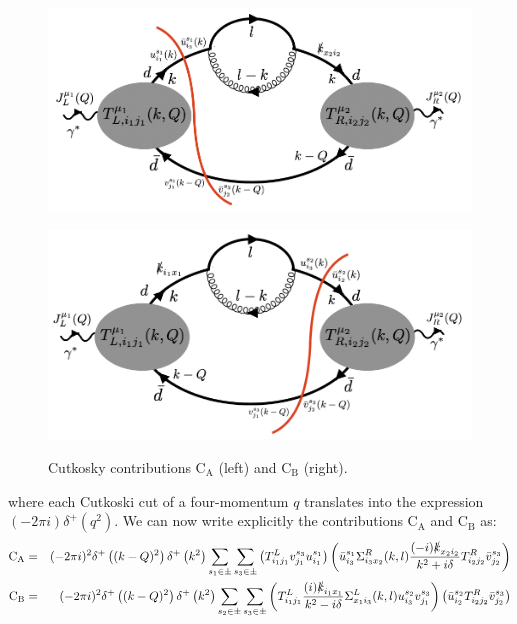 \documentclass[11pt]{article}
\begin{document}
\begin{figure}[ht!]
\begin{center}
\begin{minipage}{0.5\linewidth}
\centering
{\includegraphics[width=1\linewidth]{CA.png}}
\end{minipage}\hfill
\begin{minipage}{0.5\linewidth}
\centering
{\includegraphics[width=1\linewidth]{CB.png}}
\end{minipage}
{\caption{\label{CAB} Cutkosky contributions C$_\textrm{A}$ (left) and C$_\textrm{B}$ (right).}}
\end{center}
\end{figure}
\noindent where each Cutkoski cut of a four-momentum $q$ translates into the expression $(-2\pi i)\delta^{+}\left(q^2\right)$.
We can now write explicitly the contributions C$_\textrm{A}$ and C$_\textrm{B}$ as:
\begin{eqnarray}
\label{CABdef}
{\textrm{C}}_{\textrm{A}}&=& (-2\pi i)^2 \delta^{+}\left((k-Q)^2\right)\delta^{+}\left(k^2\right)  \sum_{s_1 \in \pm} \sum_{s_3 \in \pm} 
\left( T^{L}_{i_1 j_1} v^{s_3}_{j_1} u^{s_1}_{i_1} \right )
\left( \bar{u}^{s_1}_{i_3} \Sigma^{R}_{i_3 x_2}(k,l) \frac{(-i)\slashed{k}_{x_2 i_2}}{k^2+i\delta} T^{R}_{i_2 j_2} \bar{v}^{s_3}_{j_2} \right) \nonumber\\
{\textrm{C}}_{\textrm{B}}&=& (-2\pi i)^2 \delta^{+}\left((k-Q)^2\right)\delta^{+}\left(k^2\right) \sum_{s_2 \in \pm} \sum_{s_3 \in \pm} 
\left( T^{L}_{i_1 j_1}  \frac{(i)\slashed{k}_{i_1 x_1}}{k^2-i\delta} \Sigma^{L}_{x_1 i_3}(k,l) u^{s_2}_{i_3} v^{s_3}_{j_1} \right )
\left( \bar{u}^{s_2}_{i_2}  T^{R}_{i_2 j_2} \bar{v}^{s_3}_{j_2} \right) \nonumber\\
\end{eqnarray}
\end{document}
